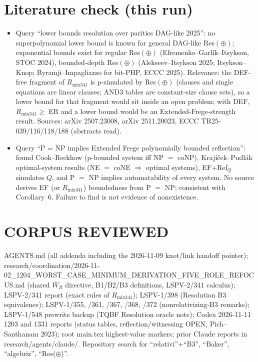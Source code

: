 \documentclass[11pt]{article}
\newcommand{\Wb}{\overline W}
\newcommand{\Rmix}{R_{\mathrm{mix341}}}
\begin{document}
\section*{Literature check (this run)}
\begin{itemize}
\item Query ``lower bounds resolution over parities DAG-like 2025'': no superpolynomial
lower bound is known for general DAG-like Res$(\oplus)$; exponential bounds exist for regular
Res$(\oplus)$ (Efremenko--Garl\'ik--Itsykson, STOC 2024), bounded-depth Res$(\oplus)$
(Alekseev--Itsykson 2025; Itsykson--Knop; Byramji--Impagliazzo for bit-PHP, ECCC 2025).
Relevance: the DEF-free fragment of $\Rmix$ is p-simulated by Res$(\oplus)$ (clauses and
single equations are linear clauses; AND3 tables are constant-size clause sets), so a
lower bound for that fragment would sit inside an open problem; with DEF, $\Rmix\ge$ ER and
a lower bound would be an Extended-Frege-strength result. Sources:
arXiv 2507.23008, arXiv 2511.20023, ECCC TR25-039/116/118/188 (abstracts read).
\item Query ``P = NP implies Extended Frege polynomially bounded reflection'': found
Cook--Reckhow (p-bounded system iff NP $=$ coNP), Krajíček--Pudlák optimal-system results
(NE $=$ coNE $\Rightarrow$ optimal systems), EF+Ref$_Q$ simulates $Q$, and P $=$ NP implies
automatability of every system. No source derives EF (or $\Rmix$) boundedness from
P $=$ NP; consistent with Corollary~6. Failure to find is not evidence of nonexistence.
\end{itemize}

\section*{CORPUS REVIEWED}
AGENTS.md (all addenda including the 2026-11-09 knot/link handoff pointer);
research/coordination/2026-11-02\_1204\_WORST\_CASE\_MINIMUM\_DERIVATION\_FIVE\_ROLE\_REFOCUS.md
(shared $\Wb_R$ directive, B1/B2/B3 definitions, LSPV-2/341 calculus);
LSPV-2/341 report (exact rules of $\Rmix$); LSPV-1/398 (Resolution B3 equivalence);
LSPV-1/355, /361, /367, /368, /372 (nonrelativizing-B3 remarks); LSPV-1/548 prewrite
backup (TQBF Resolution oracle note); Codex 2026-11-11 1203 and 1331 reports (status tables,
reflection/witnessing OPEN, Pich--Santhanam 2023); root main.tex highest-value markers;
prior Claude reports in research/agents/claude/. Repository search for
``relativi''+``B3'', ``Baker'', ``algebriz'', ``Res($\oplus$)''.
\end{document}
